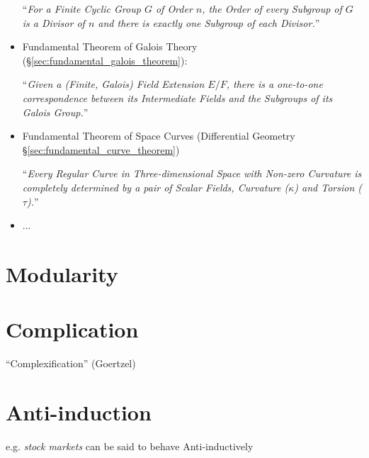 \begin{itemize}
    ``\emph{For a Finite Cyclic Group $G$ of Order $n$, the Order of every
    Subgroup of $G$ is a Divisor of $n$ and there is exactly one Subgroup of
    each Divisor.}''

  \item Fundamental Theorem of Galois Theory
    (\S\ref{sec:fundamental_galois_theorem}):

    ``\emph{Given a (Finite, Galois) Field Extension $E/F$, there is a
    one-to-one correspondence between its Intermediate Fields and the Subgroups
    of its Galois Group.}''

  \item Fundamental Theorem of Space Curves
    (Differential Geometry \S\ref{sec:fundamental_curve_theorem})

    ``\emph{Every Regular Curve in Three-dimensional Space with Non-zero
    Curvature is completely determined by a pair of Scalar Fields, Curvature
    ($\kappa$) and Torsion ($\tau$).}''

  \item ...
\end{itemize}



\section{Modularity}\label{sec:modularity}

\section{Complication}\label{sec:complication}

``Complexification'' (Goertzel)



\section{Anti-induction}\label{sec:anti_induction}

e.g. \emph{stock markets} can be said to behave Anti-inductively
